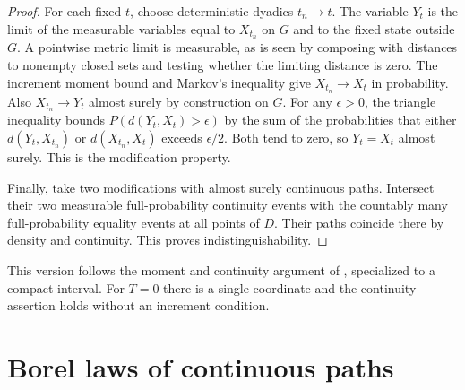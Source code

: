 \documentclass[11pt,oneside,openany]{book}
\theoremstyle{plain}
\theoremstyle{definition}
\theoremstyle{remark}
\begin{document}
\begin{proof}
For each fixed \(t\), choose deterministic dyadics \(t_n\to t\). The variable \(Y_t\) is the limit of the measurable variables equal to \(X_{t_n}\) on \(G\) and to the fixed state outside \(G\). A pointwise metric limit is measurable, as is seen by composing with distances to nonempty closed sets and testing whether the limiting distance is zero. The increment moment bound and Markov's inequality give \(X_{t_n}\to X_t\) in probability. Also \(X_{t_n}\to Y_t\) almost surely by construction on \(G\). For any \(\epsilon>0\), the triangle inequality bounds \(P(d(Y_t,X_t)>\epsilon)\) by the sum of the probabilities that either \(d(Y_t,X_{t_n})\) or \(d(X_{t_n},X_t)\) exceeds \(\epsilon/2\). Both tend to zero, so \(Y_t=X_t\) almost surely. This is the modification property.

Finally, take two modifications with almost surely continuous paths. Intersect their two measurable full-probability continuity events with the countably many full-probability equality events at all points of \(D\). Their paths coincide there by density and continuity. This proves indistinguishability.
\end{proof}

This version follows the moment and continuity argument of \cite[Theorem 4.23, pp.~95--96]{Kallenberg}, specialized to a compact interval. For \(T=0\) there is a single coordinate and the continuity assertion holds without an increment condition.

\section{Borel laws of continuous paths}\label{p05-05}
\end{document}
